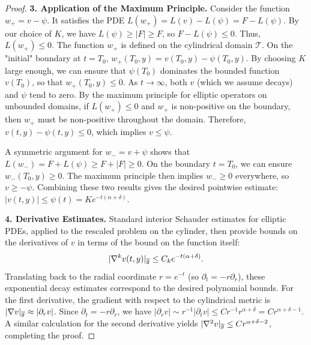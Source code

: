 \begin{proof}
\textbf{3. Application of the Maximum Principle.}
Consider the function $w_+ = v - \psi$. It satisfies the PDE $L(w_+) = L(v) - L(\psi) = F - L(\psi)$. By our choice of $K$, we have $L(\psi) \ge |F| \ge F$, so $F - L(\psi) \le 0$. Thus, $L(w_+) \le 0$.
The function $w_+$ is defined on the cylindrical domain $\mathcal{T}$. On the "initial" boundary at $t=T_0$, $w_+(T_0, y) = v(T_0, y) - \psi(T_0, y)$. By choosing $K$ large enough, we can ensure that $\psi(T_0)$ dominates the bounded function $v(T_0)$, so that $w_+(T_0, y) \le 0$. As $t \to \infty$, both $v$ (which we assume decays) and $\psi$ tend to zero. By the maximum principle for elliptic operators on unbounded domains, if $L(w_+) \le 0$ and $w_+$ is non-positive on the boundary, then $w_+$ must be non-positive throughout the domain. Therefore, $v(t,y) - \psi(t,y) \le 0$, which implies $v \le \psi$.

A symmetric argument for $w_- = v + \psi$ shows that $L(w_-) = F + L(\psi) \ge F+|F| \ge 0$. On the boundary $t=T_0$, we can ensure $w_-(T_0, y) \ge 0$. The maximum principle then implies $w_- \ge 0$ everywhere, so $v \ge -\psi$.
Combining these two results gives the desired pointwise estimate: $|v(t,y)| \le \psi(t) = K e^{-t(\alpha+\delta)}$.

\textbf{4. Derivative Estimates.}
Standard interior Schauder estimates for elliptic PDEs, applied to the rescaled problem on the cylinder, then provide bounds on the derivatives of $v$ in terms of the bound on the function itself:
\begin{equation}
    |\nabla^k v(t,y)|_{\overline{g}} \le C_k e^{-t(\alpha+\delta)}.
\end{equation}
Translating back to the radial coordinate $r = e^{-t}$ (so $\partial_t = -r\partial_r$), these exponential decay estimates correspond to the desired polynomial bounds. For the first derivative, the gradient with respect to the cylindrical metric is $|\nabla v|_{\overline{g}} \approx |\partial_r v|$. Since $\partial_t = -r\partial_r$, we have $|\partial_r v| \sim r^{-1}|\partial_t v| \le C r^{-1} r^{\alpha+\delta} = C r^{\alpha+\delta-1}$. A similar calculation for the second derivative yields $|\nabla^2 v|_{\overline{g}} \le C r^{\alpha+\delta-2}$, completing the proof.
\end{proof}

